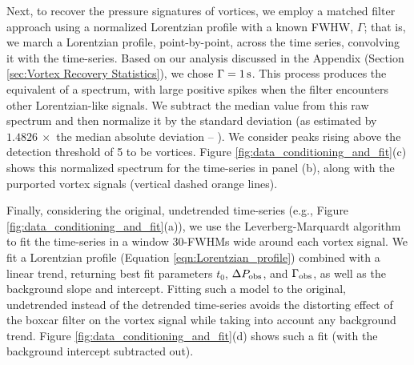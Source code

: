 \documentclass{aastex63}
\begin{document}
Next, to recover the pressure signatures of vortices, we employ a matched filter approach \citep[][ch.~13]{Press2007} using a normalized Lorentzian profile with a known FWHW, $\Gamma$; that is, we march a Lorentzian profile, point-by-point, across the time series, convolving it with the time-series. Based on our analysis discussed in the Appendix (Section \ref{sec:Vortex Recovery Statistics}), we chose $\Gamma = 1\,{\rm s}$. This process produces the equivalent of a spectrum, with large positive spikes when the filter encounters other Lorentzian-like signals. We subtract the median value from this raw spectrum and then normalize it by the standard deviation (as estimated by $1.4826\ \times$ the median absolute deviation -- \citealp{doi:10.1080/01621459.1993.10476408}). We consider peaks rising above the detection threshold of 5 to be vortices. Figure \ref{fig:data_conditioning_and_fit}(c) shows this normalized spectrum for the time-series in panel (b), along with the purported vortex signals (vertical dashed orange lines). 

Finally, considering the original, undetrended time-series (e.g., Figure \ref{fig:data_conditioning_and_fit}(a)), we use the Leverberg-Marquardt algorithm \citep[cf.][]{Press2007} to fit the time-series in a window 30-FWHMs wide around each vortex signal. We fit a Lorentzian profile (Equation \ref{eqn:Lorentzian_profile}) combined with a linear trend, returning best fit parameters $t_0$, $\Delta P_{\rm obs}$, and $\Gamma_{\rm obs}$, as well as the background slope and intercept. Fitting such a model to the original, undetrended instead of the detrended time-series avoids the distorting effect of the boxcar filter on the vortex signal while taking into account any background trend. Figure \ref{fig:data_conditioning_and_fit}(d) shows such a fit (with the background intercept subtracted out).
\end{document}
